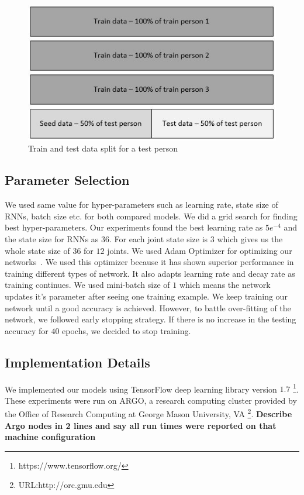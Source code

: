 \documentclass[10pt,twocolumn,letterpaper]{article}
\begin{document}
\begin{figure}[h]
	\begin{center}
		\includegraphics[width=\linewidth]{train_test_dat}
	\end{center}
	\caption{Train and test data split for a test person}
	\label{fig:train_test_dat}
\end{figure}


\subsection{Parameter Selection}
We used same value for hyper-parameters such as learning rate, state size of RNNs, batch size etc. for both compared models. We did a grid search for finding best hyper-parameters. Our experiments found the best learning rate as $5e^{-4}$ and the state size for RNNs as $36$. For each joint state size is $3$ which gives us the whole state size of $36$ for $12$ joints. We used Adam Optimizer for optimizing our networks~\cite{DBLP:journals/corr/KingmaB14}. We used this optimizer because it has shown superior performance in training different types of network. It also adapts learning rate and decay rate as training continues. We used mini-batch size of $1$ which means the network updates it's parameter after seeing one training example. We keep training our network until a good accuracy is achieved. However, to battle over-fitting of the network, we followed early stopping strategy. If there is no increase in the testing accuracy for $40$ epochs, we decided to stop training. 

\subsection{Implementation Details}
We implemented our models using TensorFlow deep learning library version $1.7$ \footnote{https://www.tensorflow.org/}. These experiments were run on ARGO, a research computing cluster provided by the Office of Research Computing at George Mason University, VA \footnote{URL:http://orc.gmu.edu}.  {\bf Describe Argo nodes in 2 lines and say all run times were reported on that machine configuration}
\end{document}
